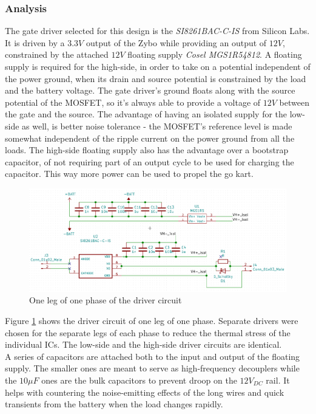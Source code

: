 \subsubsection{Analysis}
The gate driver selected for this design is the \textit{SI8261BAC-C-IS}\cite{Si8261} from Silicon Labs. It is driven by a $3.3V$ output of the Zybo while providing an output of $12V$, constrained by the attached $12V$ floating supply \textit{Cosel MGS1R54812}\cite{MGS1R5}. A floating supply is required for the high-side, in order to take on a potential independent of the power ground, when its drain and source potential is constrained by the load and the battery voltage. The gate driver's ground floats along with the source potential of the MOSFET, so it's always able to provide a voltage of $12V$ between the gate and the source. The advantage of having an isolated supply for the low-side as well, is better noise tolerance - the MOSFET's reference level is made somewhat independent of the ripple current on the power ground from all the loads. The high-side floating supply also has the advantage over a bootstrap capacitor, of not requiring part of an output cycle to be used for charging the capacitor. This way more power can be used to propel the go kart.

\begin{figure}[H]
	\centering
	\includegraphics[width=1\linewidth]{pictures/hardware/Driver_Board/driver_circuit.png}
	\caption{One leg of one phase of the driver circuit}
	\label{fig:driver_circuit}
\end{figure}

Figure \ref{fig:driver_circuit} shows the driver circuit of one leg of one phase. Separate drivers were chosen for the separate legs of each phase to reduce the thermal stress of the individual ICs. The low-side and the high-side driver circuits are identical. \\

A series of capacitors are attached both to the input and output of the floating supply. The smaller ones are meant to serve as high-frequency decouplers while the $10$$\mu$$F$  ones are the bulk capacitors to prevent droop on the $12V_{DC}$ rail. It helps with countering the noise-emitting effects of the long wires and quick transients from the battery when the load changes rapidly. \\

